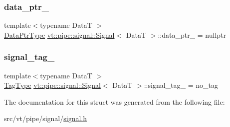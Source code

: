 \subsubsection{\texorpdfstring{data\+\_\+ptr\+\_\+}{data\_ptr\_}}
{\footnotesize\ttfamily template$<$typename DataT $>$ \\
\hyperlink{structvt_1_1pipe_1_1signal_1_1_signal_a9c8166338314e5d595575c21eaa42859}{Data\+Ptr\+Type} \hyperlink{structvt_1_1pipe_1_1signal_1_1_signal}{vt\+::pipe\+::signal\+::\+Signal}$<$ DataT $>$\+::data\+\_\+ptr\+\_\+ = nullptr\hspace{0.3cm}{\ttfamily [private]}}

\mbox{\label{structvt_1_1pipe_1_1signal_1_1_signal_ad970018d2b59a343ea9b9253d2b45858}} 
\subsubsection{\texorpdfstring{signal\+\_\+tag\+\_\+}{signal\_tag\_}}
{\footnotesize\ttfamily template$<$typename DataT $>$ \\
\hyperlink{namespacevt_a84ab281dae04a52a4b243d6bf62d0e52}{Tag\+Type} \hyperlink{structvt_1_1pipe_1_1signal_1_1_signal}{vt\+::pipe\+::signal\+::\+Signal}$<$ DataT $>$\+::signal\+\_\+tag\+\_\+ = no\+\_\+tag\hspace{0.3cm}{\ttfamily [private]}}



The documentation for this struct was generated from the following file\+:\begin{DoxyCompactItemize}
\item 
src/vt/pipe/signal/\hyperlink{signal_8h}{signal.\+h}\end{DoxyCompactItemize}
